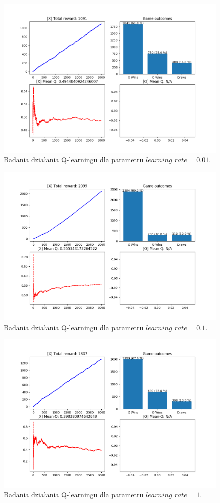 \begin{figure}[H]
	\centering
	\includegraphics[width=0.7\linewidth]{imgs/q_learning/analysis/batch/lr/lr_001}
	\caption{Badania działania Q-learningu dla parametru $learning\_rate = 0.01$.}
\end{figure}

\begin{figure}[H]
	\centering
	\includegraphics[width=0.7\linewidth]{imgs/q_learning/analysis/batch/lr/lr_01}
	\caption{Badania działania Q-learningu dla parametru $learning\_rate = 0.1$.}
\end{figure}

\begin{figure}[H]
	\centering
	\includegraphics[width=0.7\linewidth]{imgs/q_learning/analysis/batch/lr/lr_1}
	\caption{Badania działania Q-learningu dla parametru $learning\_rate = 1$.}
\end{figure}

